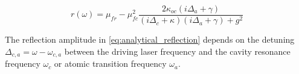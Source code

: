 \begin{equation}
    r(\omega) = \mu_{fr} - \mu_{fc}^2 \frac{2\kappa_{oc}(i\Delta_a + \gamma)}{(i\Delta_c+\kappa)(i\Delta_a+\gamma) + g^2}
    \label{eq:analytical_reflection}
\end{equation}

The reflection amplitude in \eqref{eq:analytical_reflection} depends on the detuning $\Delta_{c,a} = \omega - \omega_{c,a}$ between the driving laser frequency and the cavity resonance frequency $\omega_c$ or atomic transition frequency $\omega_a$.

